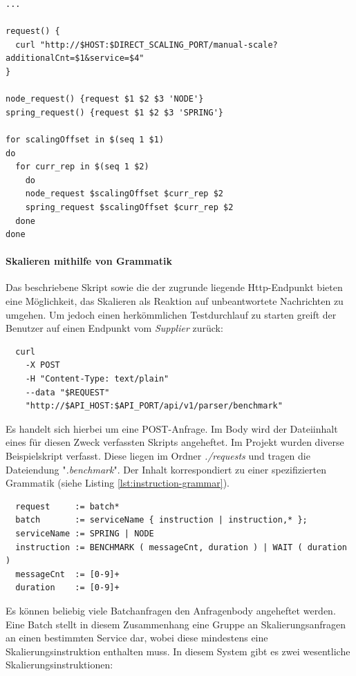 \label{lst:direct-scaling}
\begin{minipage}{\linewidth}
\begin{lstlisting}[caption={direct-scaling},style=bashStyle]
...

request() {
  curl "http://$HOST:$DIRECT_SCALING_PORT/manual-scale?additionalCnt=$1&service=$4"
}

node_request() {request $1 $2 $3 'NODE'}
spring_request() {request $1 $2 $3 'SPRING'}

for scalingOffset in $(seq 1 $1)
do 
  for curr_rep in $(seq 1 $2)
	do 
    node_request $scalingOffset $curr_rep $2
    spring_request $scalingOffset $curr_rep $2
  done
done
\end{lstlisting}
\end{minipage}

\paragraph{Skalieren mithilfe von Grammatik}
Das beschriebene Skript sowie die der zugrunde liegende Http-Endpunkt bieten eine Möglichkeit, das Skalieren als Reaktion auf unbeantwortete Nachrichten zu umgehen. Um jedoch einen herkömmlichen Testdurchlauf zu starten greift der Benutzer auf einen Endpunkt vom \emph{Supplier} zurück: 

\begin{verbatim}
  curl 
    -X POST 
    -H "Content-Type: text/plain" 
    --data "$REQUEST" 
    "http://$API_HOST:$API_PORT/api/v1/parser/benchmark"
\end{verbatim}

Es handelt sich hierbei um eine POST-Anfrage. Im Body wird der Dateiinhalt eines für diesen Zweck verfassten Skripts angeheftet. Im Projekt wurden diverse Beispielskript verfasst. Diese liegen im Ordner \emph{./requests} und tragen die Dateiendung "\emph{.benchmark}". Der Inhalt korrespondiert zu einer spezifizierten Grammatik (siehe Listing \ref{lst:instruction-grammar}).

\label{lst:instruction-grammar}
\begin{verbatim}
  request     := batch*
  batch       := serviceName { instruction | instruction,* };
  serviceName := SPRING | NODE
  instruction := BENCHMARK ( messageCnt, duration ) | WAIT ( duration )
  messageCnt  := [0-9]+
  duration    := [0-9]+
\end{verbatim}

Es können beliebig viele Batchanfragen den Anfragenbody angeheftet werden. Eine Batch stellt in diesem Zusammenhang eine Gruppe an Skalierungsanfragen an einen bestimmten Service dar, wobei diese mindestens eine Skalierungsinstruktion enthalten muss. In diesem System gibt es zwei wesentliche Skalierungsinstruktionen: 

